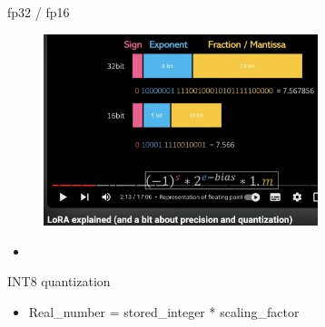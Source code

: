 \begin{vbframe}{fp32 / fp16}




\vfill

\begin{figure}
\centering
\includegraphics[width = 8cm]{figure/16bit32bit}
\end{figure}

\begin{itemize}
\item \

\end{itemize}



\vfill

\end{vbframe}

\begin{vbframe}{INT8 quantization}
\href{https://de.mathworks.com/company/newsletters/articles/what-is-int8-quantization-and-why-is-it-popular-for-deep-neural-networks.html}{} 

\vfill

\begin{itemize}
\item Real\_number = stored\_integer * scaling\_factor
\end{itemize}

\vfill

\end{vbframe}


